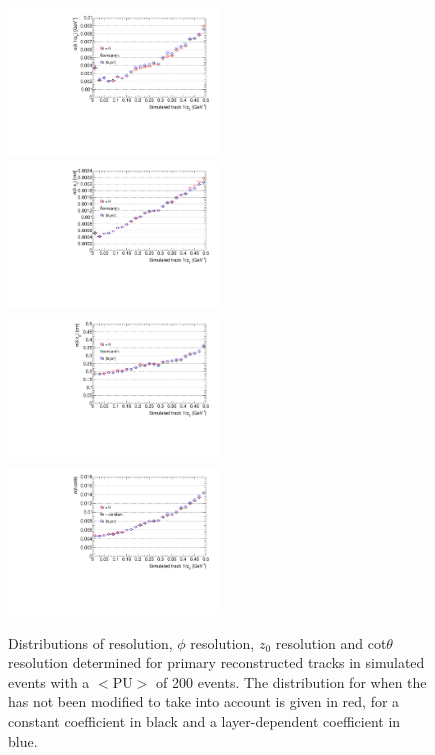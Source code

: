 \begin{figure}[htb]
\centering
\includegraphics[width=0.495\textwidth]{figs/tk-upgrade/results-lowPtTracking/qOverPtResVsInvPtTiltedGeometry_5000.pdf}
\includegraphics[width=0.495\textwidth]{figs/tk-upgrade/results-lowPtTracking/phi0ResVsInvPtTiltedGeometry_5000.pdf}
\\
\includegraphics[width=0.495\textwidth]{figs/tk-upgrade/results-lowPtTracking/z0ResVsInvPtTiltedGeometry_5000.pdf}
\includegraphics[width=0.495\textwidth]{figs/tk-upgrade/results-lowPtTracking/cotThetaResVsInvPtTiltedGeometry_5000.pdf}
\caption{Distributions of \pt resolution, $\phi$ resolution, $z_{0}$ resolution and cot$\theta$ resolution determined for primary reconstructed tracks in simulated \ttbar events with a $<\textrm{PU}>$ of 200 events. The distribution for when the \KF has not been modified to take \MS into account is given in red, for a constant \MS coefficient in black and a layer-dependent \MS coefficient in blue.
}
\label{fig:kfHelixParametersResVsInvPt}
\end{figure}

